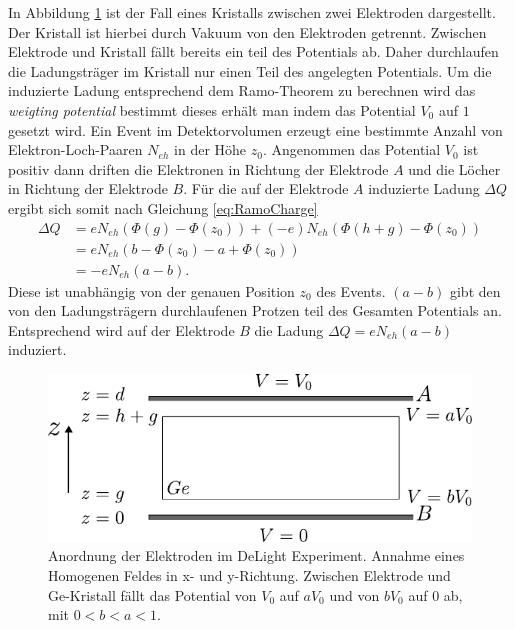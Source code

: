 In Abbildung \ref{fig:RamoDeLight} ist der Fall eines Kristalls zwischen zwei Elektroden dargestellt.
Der Kristall ist hierbei durch Vakuum von den Elektroden getrennt.
Zwischen Elektrode und Kristall fällt bereits ein teil des Potentials ab.
Daher durchlaufen die Ladungsträger im Kristall nur einen Teil des angelegten Potentials.
Um die induzierte Ladung entsprechend dem Ramo-Theorem zu berechnen wird das \textit{weigting potential} bestimmt dieses erhält man indem das Potential $V_0$ auf $1$ gesetzt wird.
Ein Event im Detektorvolumen erzeugt eine bestimmte Anzahl von Elektron-Loch-Paaren $N_{eh}$ in der Höhe $z_0$.
Angenommen das Potential $V_0$ ist positiv dann driften die Elektronen in Richtung der 
Elektrode $A$ und die Löcher in Richtung der Elektrode $B$.
Für die auf der Elektrode $A$ induzierte Ladung $\Delta Q$ ergibt sich somit nach Gleichung \eqref{eq:RamoCharge}
\begin{align}
\Delta Q &= e N_{eh}(\Phi(g) - \Phi(z_0)) + (-e)N_{eh}(\Phi(h+g) - \Phi(z_0)) \nonumber \\
&= eN_{eh}\left(b - \Phi(z_0) - a + \Phi(z_0)\right) \nonumber \\
&= -eN_{eh}(a-b).
\label{eq:RamoCharge}
\end{align}
Diese ist unabhängig von der genauen Position $z_0$ des Events.
$(a-b)$ gibt den von den Ladungsträgern durchlaufenen Protzen teil des Gesamten Potentials an.
Entsprechend wird auf der Elektrode $B$ die Ladung $\Delta Q = eN_{eh}(a-b)$ induziert.



\begin{figure}[]
\begin{center}
\includegraphics[scale=1.25]{./fig/ElektrodenDeLight.pdf}
\end{center}
\vspace{-0.5cm}
\caption{Anordnung der Elektroden im DeLight Experiment. Annahme eines Homogenen Feldes in x- und y-Richtung. Zwischen Elektrode und Ge-Kristall fällt das Potential von $V_0$ auf $aV_0$ und von $bV_0$ auf $0$ ab, mit $0 < b < a < 1$.}
\label{fig:RamoDeLight}
\end{figure}
